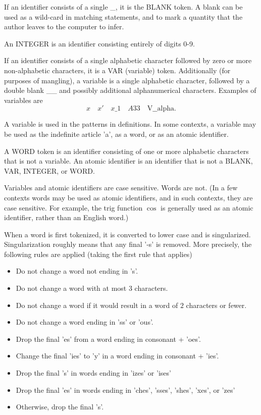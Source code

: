 \documentclass[12pt]{article}
\numberwithin{definition}{section}
\begin{document}
If an identifier consists of a single \_, it is the BLANK token.
A blank can be used as a wild-card in matching statements, and
to mark a quantity that the author leaves to the computer to infer.

An INTEGER is an identifier consisting entirely of digits 0-9.

If an identifier consists of a single alphabetic character followed by
zero or more non-alphabetic characters, it is a VAR (variable) token.
Additionally (for purposes of mangling), a variable is a single
alphabetic character, followed by a double blank \_\_ and possibly additional
alphanumerical characters.  Examples of variables are
\[
x\quad x'\quad x\_1\quad A33\quad \text{V\_\_alpha}.
\]

A variable is used in the patterns in definitions.  In some contexts, a variable
may be used as the indefinite article 'a', as a word, or as an atomic
identifier.  

A WORD token is an identifier consisting of one or more alphabetic
characters that is not a variable.  An atomic identifier is an
identifier that is not a BLANK, VAR, INTEGER, or WORD.

Variables and atomic identifiers are case sensitive. Words are not.  (In a few
contexts words may be used as atomic identifiers, and in such contexts,
they are case sensitive.  For example, the trig function $\cos$ is
generally used as an atomic identifier, rather than an English word.)

When a word is first tokenized, it is converted to lower case and is
singularized.  Singularization roughly means that any final '-s' is removed.
More precisely, the following rules are applied (taking the first rule that
applies)
\begin{itemize}
\item Do not change a word not ending in 's'.
\item Do not change a word with at most $3$ characters.
\item Do not change a word if it would result in a word of $2$ characters or fewer.
\item Do not change a word ending in 'ss' or 'ous'.
\item Drop the final 'es' from a word ending in consonant + 'oes'.
\item Change the final 'ies' to 'y' in a word ending in consonant + 'ies'.
\item Drop the final 's' in words ending in 'izes' or 'ises'
\item Drop the final 'es' in words ending in 'ches', 'sses', 'shes', 'xes', or 'zes'
\item Otherwise, drop the final 's'. 
\end{itemize}
\end{document}
